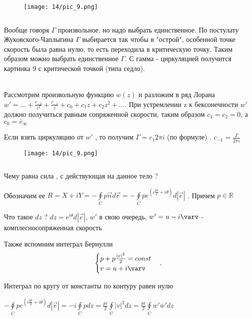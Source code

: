 \begin{wrapfigure}{l}{0.15\textwidth}
  \texttt{[image: 14/pic\_9.png]}
  \caption{\label{ris:image14.9}}
\end{wrapfigure}
$$ $$

Вообще говоря $\Gamma$ произвольное, но надо выбрать единственное. По постулату Жуковского-Чаплыгина $\Gamma$ выбирается так чтобы в "острой", особенной точке скорость была равна нулю, то есть переходила в критическую точку. Таким образом можно выбрать единственное $\Gamma$. С гамма - циркуляцией получится картинка 9 с критической точкой (типа седло).

\newpage
\ \\

Рассмотрим произвольную функцию $w(z)$ и разложим в ряд Лорана $w' = ... + \frac{c_{-2}}{z^2} + \frac{c_{-1}}{z} + c_0 + c_1 z + c_2 z^2 + ... $. При устремлении z к бексонечности $w'$ должно получиться равным сопряженной скорости, таким образом $c_1 = c_2 = 0$, а $c_0 = \bar{v}_{\infty}$

Если взять циркуляцию от $w'$ , то получим $\Gamma = c_1 2 \pi i $ (по формуле) . $c_{-1} = \frac{\Gamma}{2 \pi i}$

\begin{wrapfigure}{r}{0.15\textwidth}
  \texttt{[image: 14/pic\_9.png]}
  \caption{\label{ris:image14.10}}
\end{wrapfigure}
$$ $$

Чему равна сила , с действующая на данное тело ?

Обозначим ее $R = X + i Y = - 	\oint \limits_{C} p \overrightarrow{n} d \overrightarrow{e} = - \oint \limits_{C} p e^(i\frac{pi}{2} + i\theta) d | \overrightarrow{e} |$ . Причем $p \in \mathbb{R}$

Что такое $dz$ ? $dz = e^{i \theta} d | \overrightarrow{e} |$, $w'$  в свою очередь, $w' = u -i \varv$ -  комплесносопряженная скорость

Также вспомним интеграл Бернулли
$$ \begin{cases}
    p + p \frac{|v|^2}{2} = const \\
    v = u + i \varv
  \end{cases},$$

Интеграл по кругу от константы по контуру равен нулю

$- \oint \limits_{C} p e^(i\frac{pi}{2} + i\theta) d | \overrightarrow{e} | = -i \oint  \limits_{C} p dz = \frac{p i}{2} \oint  \limits_{C} |v|^2 dz =  \frac{p i}{2} \oint  \limits_{C} w' \bar{w}' d z$

